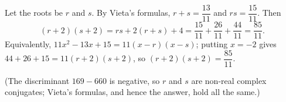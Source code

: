 Let the roots be $r$ and $s$. By Vieta's formulas, $r+s=\dfrac{13}{11}$ and $rs=\dfrac{15}{11}$. Then
\[(r+2)(s+2)=rs+2(r+s)+4=\dfrac{15}{11}+\dfrac{26}{11}+\dfrac{44}{11}=\boxed{\dfrac{85}{11}}.\]
Equivalently, $11x^2-13x+15=11(x-r)(x-s)$; putting $x=-2$ gives $44+26+15=11(r+2)(s+2)$, so $(r+2)(s+2)=\dfrac{85}{11}$.

(The discriminant $169-660$ is negative, so $r$ and $s$ are non-real complex conjugates; Vieta's formulas, and hence the answer, hold all the same.)
